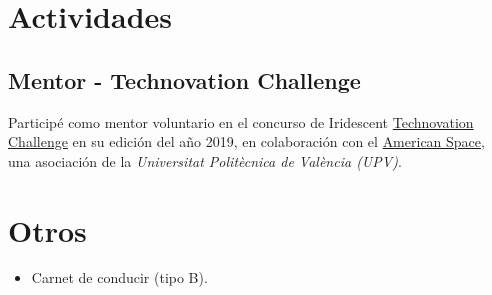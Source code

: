\documentclass[letterpaper, 12pt, dvipsnames]{article}
\newcommand{\uni}{Universitat Politècnica de València (UPV)}
\begin{document}
\section{Actividades}

\subsection{Mentor - Technovation Challenge}

Participé como mentor voluntario en el concurso de Iridescent \href{https://technovationchallenge.org/}{Technovation Challenge} en su edición del año 2019, en colaboración con el \href{https://cdl.upv.es/american-space}{American Space}, una asociación de la \emph{\uni}.

\section{Otros}

\begin{itemize}
    \item Carnet de conducir (tipo B).
\end{itemize}
\end{document}
